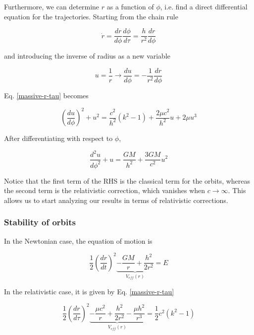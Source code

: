 \documentclass[letterpaper,11pt,onecolumn]{article}
\begin{document}
Furthermore, we can determine $r$ as a function of $\phi$, i.e. find a direct differential equation for the trajectories. Starting from the chain rule 

\begin{equation*}
    \dot{r} = \frac{dr}{d\phi} \frac{d\phi}{d\tau} = \frac{h}{r^2} \frac{dr}{d\phi} 
\end{equation*}

and introducing the inverse of radius as a new variable 

\begin{equation*}
    u = \frac{1}{r} \longrightarrow \frac{du}{d\phi} = - \frac{1}{r^2} \frac{dr}{d\phi}
\end{equation*}

Eq. \ref{massive-r-tau} becomes

\begin{equation}
    \left( \frac{du}{d\phi} \right)^2 + u^2 = \frac{c^2}{h^2} (k^2 - 1) + \frac{2\mu c^2}{h^2} u + 2 \mu u^3
\end{equation}

After differentiating with respect to $\phi$, 

\begin{equation} \label{massive-u-eq}
    \frac{d^2u}{d \phi^2} + u = \frac{GM}{h^2} + \frac{3GM}{c^2} u^2
\end{equation}

Notice that the first term of the RHS is the classical term for the orbits, whereas the second term is the relativistic correction, which vanishes when $c\to\infty$. This allows us to start analyzing our results in terms of relativistic corrections. 

\subsubsection{Stability of orbits}

In the Newtonian case, the equation of motion is 

\begin{equation} \label{massive-traj-newton}
    \frac12 \left( \frac{dr}{dt} \right)^2  \underbrace{-\frac{GM}{r} + \frac{h^2}{2r^2}}_{V_{eff}(r)} = E
\end{equation}

In the relativistic case, it is given by Eq. \ref{massive-r-tau}

\begin{equation} \label{massive-traj-rela}
    \frac12 \left( \frac{dr}{d\tau} \right)^2  \underbrace{-\frac{\mu c^2}{r} + \frac{h^2}{2r^2} - \frac{\mu h^2}{r^3}}_{V_{eff}(r)} = \frac12 c^2 (k^2-1)
\end{equation}
\end{document}
